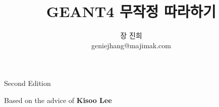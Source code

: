 \documentclass[a4paper, oneside, 12pt]{memoir}
\title{GEANT4 무작정 따라하기}
\author{장 진희\\geniejhang@majimak.com}
\begin{document}
\maketitle
\begin{center}
Second Edition

Based on the advice of \textbf{Kisoo Lee}
\end{center}
\thispagestyle{empty}

\newpage
\tableofcontents
{}

\newpage





\end{document}
